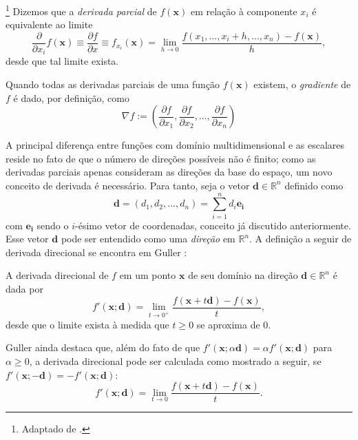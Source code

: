 \begin{definition}\footnote{Adaptado de \cite[p. 308]{thomas2}.}
Dizemos que a \textit{derivada parcial} de $f(\mathbf{x})$ em rela\c{c}\~{a}o \`{a} componente $x_i$ \'{e} equivalente ao limite
\begin{equation}
\frac{\partial}{\partial x_i}f(\mathbf{x}) \equiv \frac{\partial f}{\partial x} \equiv f_{x_i}(\mathbf{x}) = \lim_{h \to 0} \frac{f(x_1,...,x_i + h,...,x_n)-f(\mathbf{x})}{h},
\end{equation}
desde que tal limite exista.
\end{definition}

Quando todas as derivadas parciais de uma fun\c{c}\~{a}o $f(\mathbf{x})$ existem, o \textit{gradiente} de $f$ \'{e} dado, por defini\c{c}\~{a}o, como
\begin{equation}
\nabla f := (\frac{\partial f}{\partial x_1},\frac{\partial f}{\partial x_2},...,\frac{\partial f}{\partial x_n})
\end{equation}

A principal diferen\c{c}a entre fun\c{c}\~{o}es com dom\'{i}nio multidimensional e as escalares reside no fato de que o n\'{u}mero de dire\c{c}\~{o}es poss\'{i}veis n\~{a}o \'{e} finito; como as derivadas parciais apenas consideram as dire\c{c}\~{o}es da base do espa\c{c}o, um novo conceito de derivada \'{e} necess\'{a}rio. Para tanto, seja o vetor $\mathbf{d} \in \mathbb{R}^{n}$ definido como
\begin{equation*}
\mathbf{d} = (d_1,d_2,...,d_n) = \sum_{i=1}^{n} d_i\mathbf{e_i}
\end{equation*}
com $\mathbf{e_i}$ sendo o $i$-\'{e}simo vetor de coordenadas, conceito j\'{a} discutido anteriormente. Esse vetor $\mathbf{d}$ pode ser entendido como uma \textit{dire\c{c}\~{a}o} em $\mathbb{R}^{n}$. A defini\c{c}\~{a}o a seguir de derivada direcional se encontra em Guller \cite{guller}:
 
\begin{definition}\label{direcDif}
A derivada direcional de $f$ em um ponto $\mathbf{x}$ de seu dom\'{i}nio na dire\c{c}\~{a}o $\mathbf{d} \in \mathbb{R}^{n}$ \'{e} dada por
\begin{equation}
f'(\mathbf{x};\mathbf{d}) = \lim_{t \to 0^+} \frac{f(\mathbf{x}+t\mathbf{d})-f(\mathbf{x})}{t},
\end{equation}
desde que o limite exista \`{a} medida que $t \ge 0$ se aproxima de $0$.
\end{definition}

Guller ainda destaca que, al\'{e}m do fato de que $f'(\mathbf{x};\alpha\mathbf{d}) = \alpha f'(\mathbf{x};\mathbf{d})$ para $\alpha \ge 0$, a derivada direcional pode ser calculada como mostrado a seguir, se $f'(\mathbf{x};-\mathbf{d}) = -f'(\mathbf{x};\mathbf{d})$:
\begin{equation*}
f'(\mathbf{x};\mathbf{d}) = \lim_{t \to 0} \frac{f(\mathbf{x}+t\mathbf{d})-f(\mathbf{x})}{t}.
\end{equation*}

